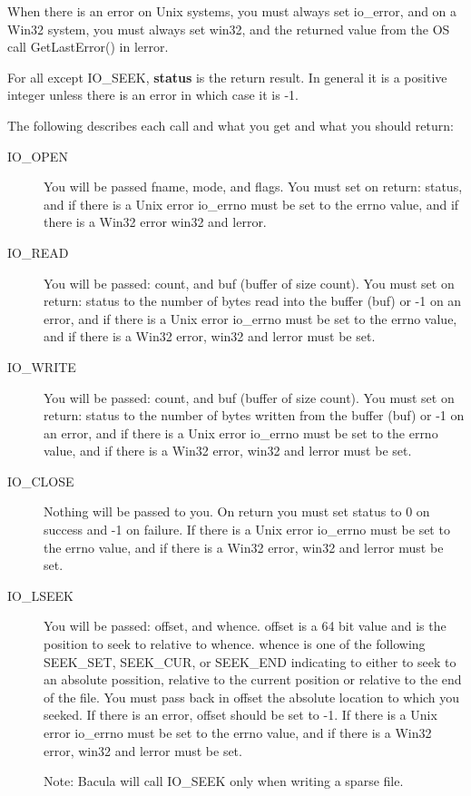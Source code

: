 When there is an error on Unix systems, you must always set io\_error, and
on a Win32 system, you must always set win32, and the returned value from
the OS call GetLastError() in lerror.

For all except IO\_SEEK, {\bf status} is the return result.  In general it is
a positive integer unless there is an error in which case it is -1.

The following describes each call and what you get and what you
should return:

\begin{description}
 \item [IO\_OPEN]
   You will be passed fname, mode, and flags.
   You must set on return: status, and if there is a Unix error
   io\_errno must be set to the errno value, and if there is a 
   Win32 error win32 and lerror. 

 \item [IO\_READ]
  You will be passed: count, and buf (buffer of size count).
  You must set on return: status to the number of bytes 
  read into the buffer (buf) or -1 on an error, 
  and if there is a Unix error
  io\_errno must be set to the errno value, and if there is a
  Win32 error, win32 and lerror must be set.

 \item [IO\_WRITE]
  You will be passed: count, and buf (buffer of size count).
  You must set on return: status to the number of bytes 
  written from the buffer (buf) or -1 on an error, 
  and if there is a Unix error
  io\_errno must be set to the errno value, and if there is a
  Win32 error, win32 and lerror must be set.

 \item [IO\_CLOSE]
  Nothing will be passed to you.  On return you must set 
  status to 0 on success and -1 on failure.  If there is a Unix error
  io\_errno must be set to the errno value, and if there is a
  Win32 error, win32 and lerror must be set.

 \item [IO\_LSEEK]
  You will be passed: offset, and whence. offset is a 64 bit value
  and is the position to seek to relative to whence.  whence is one
  of the following SEEK\_SET, SEEK\_CUR, or SEEK\_END indicating to
  either to seek to an absolute possition, relative to the current 
  position or relative to the end of the file.
  You must pass back in offset the absolute location to which you 
  seeked. If there is an error, offset should be set to -1.
  If there is a Unix error
  io\_errno must be set to the errno value, and if there is a
  Win32 error, win32 and lerror must be set.

  Note: Bacula will call IO\_SEEK only when writing a sparse file.
  
\end{description}

